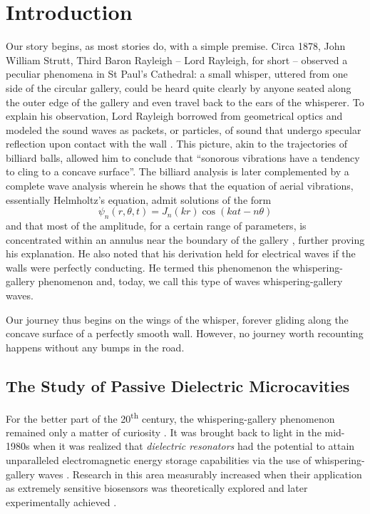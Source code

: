 \chapter{Introduction}

Our story begins, as most stories do, with a simple premise. 
Circa 1878, John William Strutt, Third Baron Rayleigh -- Lord Rayleigh, for short -- 
observed a peculiar phenomena in 
St Paul's Cathedral: a small whisper, uttered from one side of the circular
gallery, could be heard quite clearly by anyone seated along the outer edge of the gallery
and even travel back to the ears of the whisperer.
To explain his observation, Lord Rayleigh borrowed from geometrical optics
and modeled the sound waves as packets, or particles, of sound that undergo
specular reflection upon contact with the wall \cite[\S287]{RAY1878}. 
This picture, akin to the trajectories of billiard balls, allowed him to 
conclude that ``sonorous vibrations have a tendency to cling to a concave surface''.
The billiard analysis is later complemented by a complete wave analysis wherein 
he shows that the equation of aerial vibrations, essentially Helmholtz's equation, 
admit solutions of the form
  \begin{equation*}
   \psi_n(r,\theta,t)=J_n(kr)\cos(kat-n\theta)
  \end{equation*}
and that most of the amplitude, for a certain range of parameters, 
is concentrated within an annulus near the boundary of the gallery \cite{RAY1910}, 
further proving his explanation.
He also noted that his derivation held for electrical waves if the walls
were perfectly conducting. He termed this phenomenon the whispering-gallery 
phenomenon and, today, we call this type of waves whispering-gallery waves.

Our journey thus begins on the wings of the whisper, forever gliding
along the concave surface of a perfectly smooth wall. However, no 
journey worth recounting happens without any bumps in the road.

\section{The Study of Passive Dielectric Microcavities}

For the better part of the 20\textsuperscript{th} century, the whispering-gallery 
phenomenon remained only a matter of curiosity \cite{WRI2012}. It was brought
back to light in the mid-1980s when it was realized that \textit{dielectric resonators}
had the potential to attain unparalleled electromagnetic energy storage
capabilities via the use of whispering-gallery waves \cite{YAM1993}.
Research in this area measurably increased when their application as 
extremely sensitive biosensors was theoretically explored 
and later experimentally achieved \cite{SER95,VOL2002,ARM2003,VOL2008}.

